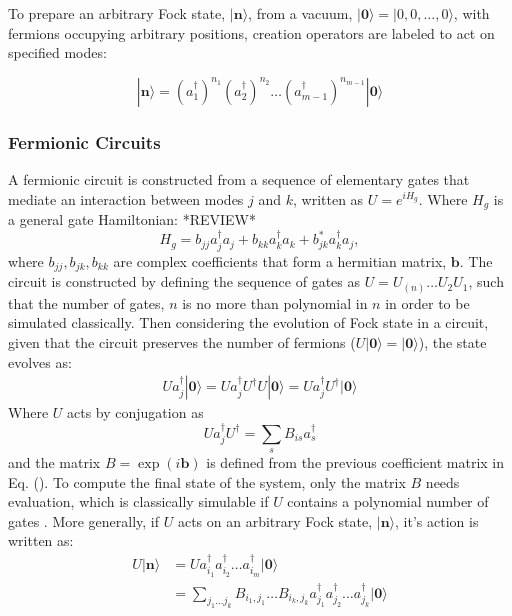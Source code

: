 To prepare an arbitrary Fock state, $|{\mathbf n}\rangle$, from a vacuum, $|{\mathbf 0}\rangle = |0,0,\dots,0\rangle$,
with fermions occupying arbitrary positions, creation operators are labeled to act on specified modes:

\begin{equation}
    |{\mathbf n}\rangle = (a_{1}^{\dagger})^{n_1} (a_{2}^{\dagger})^{n_2} \dots (a_{m-1}^{\dagger})^{n_{m-1}}|{\mathbf 0}\rangle
\end{equation}

\subsubsection{Fermionic Circuits}
A fermionic circuit is constructed from a sequence of elementary gates that mediate an interaction between
modes $j$ and $k$, written as $U = e^{iH_g}$. Where $H_g$ is a general gate Hamiltonian: *REVIEW*
\begin{equation}\label{gateham}
    H_g = b_{jj}a_j^{\dagger}a_j + b_{kk} a_{k}^{\dagger}a_{k} + b^{*}_{jk}a_k^{\dagger}a_j,
\end{equation}
where $b_{jj}, b_{jk}, b_{kk}$ are complex coefficients that form a hermitian matrix, $\mathbf b$.
The circuit is constructed by defining the
sequence of gates as $U = U_{(n)} \dots U_2 U_1$, such that the number of gates, $n$ is no more than
polynomial in $n$ in order to be simulated classically. Then considering the evolution of Fock state in a circuit, given that the
circuit preserves the number of fermions ($U|{\mathbf 0}\rangle = |{\mathbf 0}\rangle  $), the state evolves as:
\begin{align}
    U a_j^{\dagger} |{\mathbf 0}\rangle = U a_j^{\dagger} U^{\dagger}U |{\mathbf 0}\rangle = U a_j^{\dagger} U^{\dagger} |{\mathbf 0}\rangle
\end{align}
Where $U$ acts by conjugation as
\begin{equation}
    U a_j^{\dagger} U^{\dagger} = \sum_s B_{is} a_s^{\dagger}
\end{equation}
and the matrix $B = \exp(i{\mathbf b})$ is defined from the previous coefficient matrix in Eq. ().
To compute the final state of the system, only the matrix $B$ needs evaluation, which is classically simulable if $U$ contains
a polynomial number of gates \cite{Terhal2001}. More generally, if $U$ acts on an arbitrary Fock state, $|{\mathbf n}\rangle$, it's action
is written as:
\begin{align}
    U |{\mathbf n}\rangle & = U a_{i_1}^{\dagger} a_{i_2}^{\dagger}\dots a_{i_m}^{\dagger}|{\mathbf 0}\rangle                                                    \\
                          & = \sum_{j_1 \dots j_k} B_{i_1, j_1} \dots B_{i_k, j_k} a_{j_1}^{\dagger} a_{j_2}^{\dagger}\dots a_{j_k}^{\dagger}|{\mathbf 0}\rangle
\end{align}
